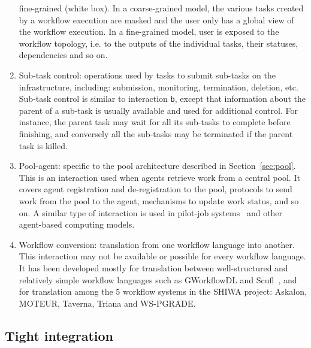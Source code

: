 \documentclass[preprint,3p,twocolumn]{elsarticle}
\begin{document}
\begin{enumerate}[leftmargin=0cm,itemindent=0.65cm,label=\texttt{(\alph*)}]
  fine-grained (white box). In a coarse-grained model, the various
  tasks created by a workflow execution are masked and the user only
  has a global view of the workflow execution. In a fine-grained
  model, user is exposed to the workflow topology, i.e. to the outputs
  of the individual tasks, their statuses, dependencies and so on.
\item Sub-task control: operations used by tasks to submit sub-tasks
  on the infrastructure, including: submission, monitoring,
  termination, deletion, etc. Sub-task control is similar to
  interaction \texttt{b}, except that information about the parent
  of a sub-task is usually available and used for
  additional control. For instance, the parent task may wait for all
  its sub-tasks to complete before finishing, and conversely all the
  sub-tasks may be terminated if the parent task is killed.
\item Pool-agent: specific to the pool architecture described in
  Section~\ref{sec:pool}. This is an interaction used when agents
  retrieve work from a central pool. It covers agent registration and
  de-registration to the pool, protocols to send work from the pool to
  the agent, mechanisms to update work status, and so on. A similar
  type of interaction is used in pilot-job
  systems~\cite{turilli2015comprehensive} and other agent-based
  computing models.
\item Workflow conversion: translation from one workflow language into
  another. This interaction may not be available or possible for every
  workflow language. It has been developed mostly for translation
  between well-structured and relatively simple workflow languages
  such as GWorkflowDL and Scufl~\cite{OLAB-09}, and for translation
  among the 5 workflow systems in the SHIWA project: Askalon, MOTEUR,
  Taverna, Triana and WS-PGRADE.  
\end{enumerate}


\subsection{Tight integration}
\end{document}
